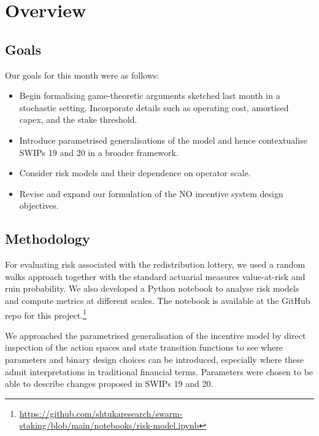 \maketitle
\section*{Overview}

\subsection*{Goals}

Our goals for this month were as follows: 

\begin{itemize}
  \item 
    Begin formalising game-theoretic arguments sketched last month in a stochastic setting.
    Incorporate details such as operating cost, amortised capex, and the stake threshold.
  \item
    Introduce parametrised generalisations of the model and hence contextualise SWIPs 19 and 20 in a broader framework.
  \item 
    Consider risk models and their dependence on operator scale.
  \item
    Revise and expand our formulation of the NO incentive system design objectives.
\end{itemize}

\subsection*{Methodology}

For evaluating risk associated with the redistribution lottery, we used a random walks approach together with the standard actuarial measures value-at-risk and ruin probability.
%
We also developed a Python notebook to analyse risk models and compute metrics at different scales. The notebook is available at the GitHub repo for this project.\footnote{\url{https://github.com/shtukaresearch/swarm-staking/blob/main/notebooks/risk-model.ipynb}}

We approached the parametrised generalisation of the incentive model by direct inspection of the action spaces and state transition functions to see where parameters and binary design choices can be introduced, especially where these admit interpretations in traditional financial terms. 
%
Parameters were chosen to be able to describe changes proposed in SWIPs 19 and 20.


